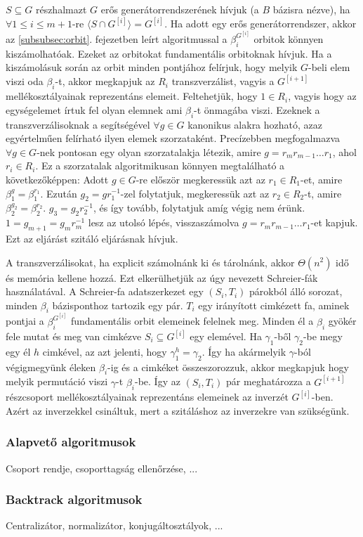$S \subseteq G$ részhalmazt $G$ erős generátorrendszerének hívjuk (a $B$ bázisra nézve), ha $\forall 1\le i \le m+1$-re $\langle S \cap G^{[i]} \rangle = G^{[i]}$.
Ha adott egy erős generátorrendszer, akkor az \ref{subsubsec:orbit}. fejezetben leírt algoritmussal a $\beta_i^{G^{[i]}}$ orbitok könnyen kiszámolhatóak.
Ezeket az orbitokat fundamentális orbitoknak hívjuk.
Ha a kiszámolásuk során az orbit minden pontjához felírjuk, hogy melyik $G$-beli elem viszi oda $\beta_i$-t, akkor megkapjuk az $R_i$ transzverzálist,
vagyis a $G^{[i+1]}$ mellékosztályainak reprezentáns elemeit.
Feltehetjük, hogy $1 \in R_i$, vagyis hogy az egységelemet írtuk fel olyan elemnek ami $\beta_i$-t önmagába viszi. Ezeknek a transzverzálisoknak a segítségével
$\forall g \in G$ kanonikus alakra hozható, azaz egyértelműen felírható ilyen elemek szorzataként.
Precízebben megfogalmazva $\forall g \in G$-nek pontosan egy olyan szorzatalakja létezik, amire $g = r_m r_{m-1} \dots r_1$, ahol $r_i \in R_i$.
Ez a szorzatalak algoritmikusan könnyen megtalálható a következőképpen: Adott $g \in G$-re először megkeressük azt az $r_1 \in R_1$-et, amire $\beta_1^g = \beta_1^{r_1}$.
Ezután $g_2 = g r_1^{-1}$-zel folytatjuk, megkeressük azt az $r_2 \in R_2$-t, amire $\beta_2^{g_2} = \beta_2^{r_2}$. $g_3 = g_2 r_2^{-1}$, és így tovább, folytatjuk amíg végig nem érünk.
$1 = g_{m+1} = g_{m} r_m^{-1}$ lesz az utolsó lépés, visszaszámolva $g = r_m r_{m-1} \dots r_1$-et kapjuk. Ezt az eljárást szitáló eljárásnak hívjuk.

A transzverzálisokat, ha explicit számolnánk ki és tárolnánk, akkor $\Theta(n^2)$ idő és memória kellene hozzá.
Ezt elkerülhetjük az úgy nevezett Schreier-fák használatával.
A Schreier-fa adatszerkezet egy $(S_i, T_i)$ párokból álló sorozat, minden $\beta_i$ bázisponthoz tartozik egy pár.
$T_i$ egy irányított cimkézett fa, aminek pontjai a $\beta_i^{G^{[i]}}$ fundamentális orbit elemeinek felelnek meg.
Minden él a $\beta_i$ gyökér fele mutat és meg van cimkézve $S_i \subseteq G^{[i]}$ egy elemével.
Ha $\gamma_1$-ből $\gamma_2$-be megy egy él $h$ cimkével, az azt jelenti, hogy $\gamma_1^h=\gamma_2$.
Így ha akármelyik $\gamma$-ból végigmegyünk éleken $\beta_i$-ig és a cimkéket összeszorozzuk, akkor megkapjuk hogy melyik
permutáció viszi $\gamma$-t $\beta_i$-be. Így az $(S_i, T_i)$ pár meghatározza a $G^{[i+1]}$ részcsoport mellékosztályainak 
reprezentáns elemeinek az inverzét $G^{[i]}$-ben. Azért az inverzekkel csináltuk, mert a szitáláshoz az inverzekre van szükségünk.


\subsubsection{Alapvető algoritmusok}
\label{subsubsec:permbasic}
Csoport rendje, csoporttagság ellenőrzése, ...

\subsubsection{Backtrack algoritmusok}
\label{subsubsec:permbt}
Centralizátor, normalizátor, konjugáltosztályok, ...
